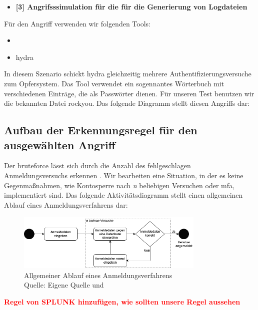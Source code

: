 \begin{itemize}[noitemsep]
   \item	\textbf{[3] Angrifsssimulation für die für die Generierung von Logdateien}
\end{itemize}

Für den Angriff verwenden wir folgenden Tools:

\begin{itemize}[noitemsep]
   \item	{}
   \item \gls{hydra}
\end{itemize}

In diesem Szenario schickt \gls{hydra} gleichzeitig mehrere Authentifizierungsversuche zum Opfersystem. Das Tool verwendet ein sogennantes Wörterbuch mit verschiedenen Einträge, die als Passwörter dienen. Für unseren Test benutzen wir die bekannten Datei \gls{rockyou}. Das folgende Diagramm stellt diesen Angriffs dar:






\subsection{Aufbau der Erkennungsregel für den ausgewählten Angriff}
Der \gls{bruteforce} lässt sich durch die Anzahl des fehlgeschlagen Anmeldungsversuchs erkennen \citep{Selvaganesh_SplunkBruteForce}. Wir bearbeiten eine Situation, in der es keine Gegenmaßnahmen, wie Kontosperre nach \textit{n} beliebigen Versuchen oder \gls{mfa}, implementiert sind. Das folgende Aktivitätsdiagramm stellt einen allgemeinen Ablauf eines Anmeldungsverfahrens dar:

\begin{figure}[H]
   \centering
   \includegraphics[width=0.8\textwidth]{assets/Anmeldeverfahren.drawio.png}
   \caption{Allgemeiner Ablauf eines Anmeldungsverfahrens \\Quelle: Eigene Quelle und \citep{Selvaganesh_SplunkBruteForce}}
   \centering
\end{figure}

\textcolor{red}{\textbf{Regel von SPLUNK hinzufügen, wie sollten unsere Regel aussehen}}

